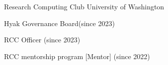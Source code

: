 


\begin{cventries}

\cventry
  {}
  {Research Computing Club} %
  {University of Washington} %
  {}
  {
    \begin{cvitems}
    \item{Hyak Governance Board(since 2023)}
    \item{RCC Officer (since 2023)}
    \item{RCC mentorship program [Mentor] (since 2022)}
    \end{cvitems}
  }

\end{cventries}
